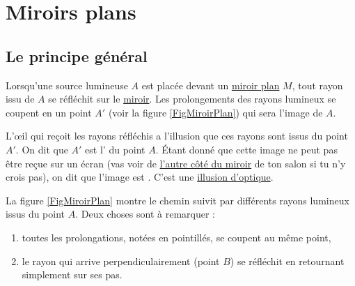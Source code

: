 

\section{Miroirs plans}

\subsection{Le principe général}

Lorsqu'une source lumineuse $A$ est placée devant un \href{http://fr.wikipedia.org/wiki/Miroir_plan}{miroir plan} $M$, tout rayon issu de $A$ se réfléchit sur le \href{http://fr.wikipedia.org/wiki/Miroir}{miroir}. Les prolongements des rayons lumineux se coupent en un point $A'$ (voir la figure \ref{FigMiroirPlan}) qui sera l'image de $A$.

L'\oe il qui reçoit les rayons réfléchis a l'illusion que ces rayons sont issus du point $A'$. On dit que $A'$ est l' du point $A$. Étant donné que cette image ne peut pas être reçue sur un écran (vas voir de \href{http://fr.wikipedia.org/wiki/De_l'autre_côté_du_miroir}{l'autre côté du miroir} de ton salon si tu n'y crois pas),  on dit que l'image est . C'est une \href{http://fr.wikipedia.org/wiki/Illusion_d'optique}{illusion d'optique}. 

La figure \ref{FigMiroirPlan} montre le chemin suivit par différents rayons lumineux issus du point $A$. Deux choses sont à remarquer :
\begin{enumerate}
\item toutes les prolongations, notées en pointillés, se coupent au même point,
\item le rayon qui arrive perpendiculairement (point $B$) se réfléchit en retournant simplement sur ses pas.
\end{enumerate}

